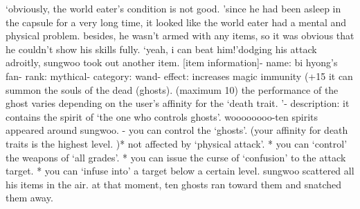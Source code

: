 ‘obviously, the world eater’s condition is not good.
’since he had been asleep in the capsule for a very long time, it looked like the world eater had a mental and physical problem.
 besides, he wasn’t armed with any items, so it was obvious that he couldn’t show his skills fully.
‘yeah, i can beat him!’dodging his attack adroitly, sungwoo took out another item.
[item information]- name: bi hyong’s fan- rank: mythical- category: wand- effect: increases magic immunity (+15%
 it can summon the souls of the dead (ghosts).
 (maximum 10) the performance of the ghost varies depending on the user’s affinity for the ‘death trait.
’- description: it contains the spirit of ‘the one who controls ghosts’.
woooooooo-ten spirits appeared around sungwoo.
- you can control the ‘ghosts’.
 (your affinity for death traits is the highest level.
)* not affected by ‘physical attack’.
* you can ‘control’ the weapons of ‘all grades’.
* you can issue the curse of ‘confusion’ to the attack target.
* you can ‘infuse into’ a target below a certain level.
sungwoo scattered all his items in the air.
 at that moment, ten ghosts ran toward them and snatched them away.


 